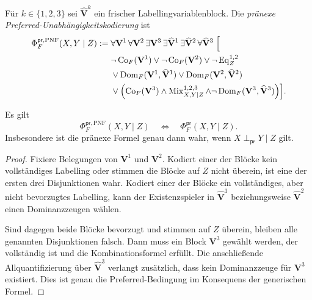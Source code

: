 \begin{Definition}
    \label{def:preferred-independence-prenex}
    Für \(k\in\{1,2,3\}\) sei
    \(\widehat{\mathbf V}^{k}\) ein frischer Labellingvariablenblock. Die
    \emph{pränexe Preferred-Unabhängigkeitskodierung} ist
    \[
    \begin{split}
        \Phi^{\mathsf{pr},\mathrm{PNF}}_F(X,Y\mid Z)
        := {}&
        \forall\mathbf V^1\,\forall\mathbf V^2\,
        \exists\mathbf V^3\,
        \exists\widehat{\mathbf V}^{1}\,
        \exists\widehat{\mathbf V}^{2}\,
        \forall\widehat{\mathbf V}^{3}
        \;\Bigl[
        \\
        &\neg\operatorname{Co}_F(\mathbf V^1)
        \lor
        \neg\operatorname{Co}_F(\mathbf V^2)
        \lor
        \neg\operatorname{Eq}^{1,2}_Z
        \\
        &\lor
        \operatorname{Dom}_F
            (\mathbf V^1,\widehat{\mathbf V}^{1})
        \lor
        \operatorname{Dom}_F
            (\mathbf V^2,\widehat{\mathbf V}^{2})
        \\
        &\lor
        \Bigl(
            \operatorname{Co}_F(\mathbf V^3)
            \land
            \operatorname{Mix}^{1,2,3}_{X,Y\mid Z}
            \land
            \neg\operatorname{Dom}_F
                (\mathbf V^3,\widehat{\mathbf V}^{3})
        \Bigr)
        \Bigr].
    \end{split}
    \]
\end{Definition}

\begin{Proposition}
    \label{prop:preferred-independence-prenex-correct}
    Es gilt
    \[
        \Phi^{\mathsf{pr},\mathrm{PNF}}_F(X,Y\mid Z)
        \quad\Longleftrightarrow\quad
        \Phi^{\mathsf{pr}}_F(X,Y\mid Z).
    \]
    Insbesondere ist die pränexe Formel genau dann wahr, wenn
    \(X\perp_{\mathsf{pr}}Y\mid Z\) gilt.
\end{Proposition}

\begin{proof}
    Fixiere Belegungen von \(\mathbf V^1\) und \(\mathbf V^2\). Kodiert
    einer der Blöcke kein vollständiges Labelling oder stimmen die Blöcke
    auf \(Z\) nicht überein, ist eine der ersten drei Disjunktionen wahr.
    Kodiert einer der Blöcke ein vollständiges, aber nicht bevorzugtes
    Labelling, kann der Existenzspieler in
    \(\widehat{\mathbf V}^{1}\) beziehungsweise
    \(\widehat{\mathbf V}^{2}\) einen Dominanzzeugen wählen.

    Sind dagegen beide Blöcke bevorzugt und stimmen auf \(Z\) überein,
    bleiben alle genannten Disjunktionen falsch. Dann muss ein Block
    \(\mathbf V^3\) gewählt werden, der vollständig ist und die
    Kombinationsformel erfüllt. Die anschließende Allquantifizierung über
    \(\widehat{\mathbf V}^{3}\) verlangt zusätzlich, dass kein
    Dominanzzeuge für \(\mathbf V^3\) existiert. Dies ist genau die
    Preferred-Bedingung im Konsequens der generischen Formel.
\end{proof}

